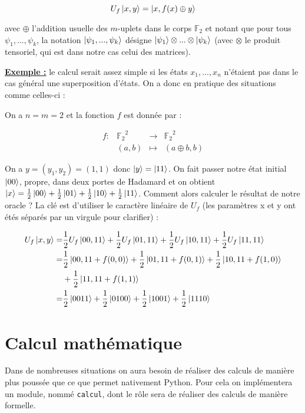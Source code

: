 \documentclass[french]{article}
\newcommand{\p}{\texttt} %
\newcommand{\exemple}{\textbf{\underline{Exemple :} }}
\newcommand{\fonction}[5]{\begin{array}{l|rcl}
#1: & #2 & \longrightarrow & #3 \\
    & #4 & \longmapsto & #5 \end{array}}
\begin{document}
$$U_f \ket{x, y} = \ket{x, f(x) \oplus y}$$

avec $\oplus$ l'addition usuelle des $m$-uplets dans le corps $\mathbb{F}_2$ et notant que pour tous $\psi_1, ..., \psi_k$, la notation $\ket{\psi_1, ..., \psi_k}$ désigne $\ket{\psi_1} \otimes ... \otimes \ket{\psi_k}$ (avec $\otimes$ le produit tensoriel, qui est dans notre cas celui des matrices). \newline

\noindent \exemple le calcul serait assez simple si les états $x_1, ..., x_n$ n'étaient pas dans le cas général une superposition d'états. On a donc en pratique des situations comme celles-ci :

On a $n = m = 2$ et la fonction $f$ est donnée par :

$$\fonction{f}{{\mathbb{F}_2}^2}{{\mathbb{F}_2}^2}{(a, b)}{(a \oplus b, b)}$$

On a $y = (y_1, y_2) = (1, 1)$ donc $\ket y = \ket{11}$. On fait passer notre état initial $\ket{00}$, propre, dans deux portes de Hadamard et on obtient $\ket{x} = \frac{1}{2}\ket{00} + \frac{1}{2}\ket{01} + \frac{1}{2} \ket{10} + \frac{1}{2} \ket{11}$. Comment alors calculer le résultat de notre oracle ? La clé est d'utiliser le caractère linéaire de $U_f$ (les paramètres x et y ont étés séparés par un virgule pour clarifier) :

\begin{equation*}
\begin{split}
    U_f \ket{x, y} =& \frac{1}{2} U_f \ket{00,11} + \frac{1}{2} U_f \ket{01,11} + \frac{1}{2} U_f \ket{10,11} + \frac{1}{2} U_f \ket{11,11} \\
    =& \frac{1}{2} \ket{00,11 + f(0,0)} + \frac{1}{2} \ket{01, 11 + f(0,1)} + \frac{1}{2} \ket{10,11 + f(1,0)} \\
    & + \frac{1}{2} \ket{11, 11 + f(1,1)} \\
    =& \frac{1}{2} \ket{0011} + \frac{1}{2} \ket{0100} + \frac{1}{2} \ket{1001} + \frac{1}{2} \ket{1110}
\end{split}
\end{equation*}

\section{Calcul mathématique}


Dans de nombreuses situations on aura besoin de réaliser des calculs de manière plus poussée que ce que permet nativement Python. Pour cela on implémentera un module, nommé \p{calcul}, dont le rôle sera de réaliser des calculs de manière formelle.
\end{document}
